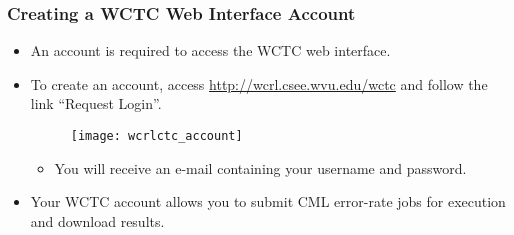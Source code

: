 \begin{frame}
  \frametitle{Creating a WCTC Web Interface Account}

  \begin{itemize}

  \item An account is required to access the WCTC web interface.

  \item To create an account, access \url{http://wcrl.csee.wvu.edu/wctc} and follow the link ``Request Login''.

    \begin{figure}
      \centering
      \texttt{[image: wcrlctc\_account]}
    \end{figure}

    \begin{itemize}
    \item{ You will receive an e-mail containing your username and password. }
    \end{itemize}

  \item Your WCTC account allows you to submit CML error-rate jobs for execution and download results.

  \end{itemize}

\end{frame}
